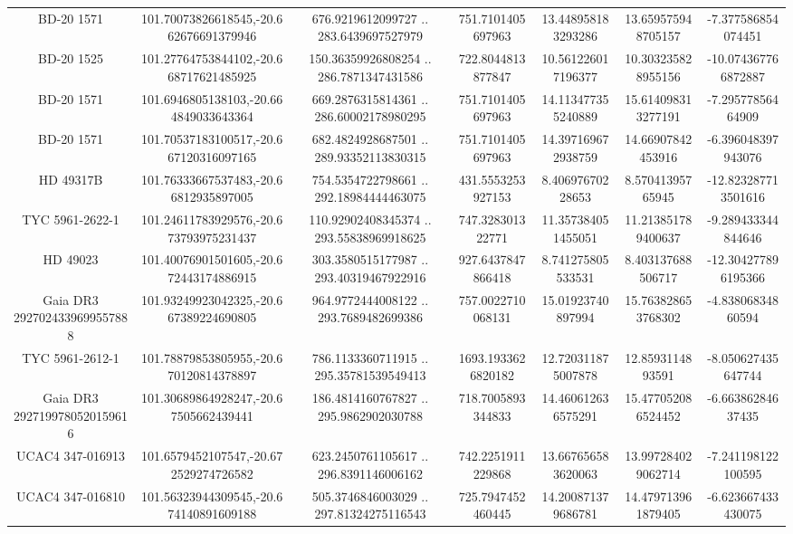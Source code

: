 \begin{table}
\begin{tabular}{ccccccc}
BD-20  1571 & 101.70073826618545,-20.662676691379946 & 676.9219612099727 .. 283.6439697527979 & 751.7101405697963 & 13.448958183293286 & 13.659575948705157 & -7.377586854074451 \\
BD-20  1525 & 101.27764753844102,-20.668717621485925 & 150.36359926808254 .. 286.7871347431586 & 722.8044813877847 & 10.561226017196377 & 10.303235828955156 & -10.074367766872887 \\
BD-20  1571 & 101.6946805138103,-20.664849033643364 & 669.2876315814361 .. 286.60002178980295 & 751.7101405697963 & 14.113477355240889 & 15.614098313277191 & -7.29577856464909 \\
BD-20  1571 & 101.70537183100517,-20.667120316097165 & 682.4824928687501 .. 289.93352113830315 & 751.7101405697963 & 14.397169672938759 & 14.66907842453916 & -6.396048397943076 \\
HD  49317B & 101.76333667537483,-20.66812935897005 & 754.5354722798661 .. 292.18984444463075 & 431.5553253927153 & 8.40697670228653 & 8.57041395765945 & -12.823287713501616 \\
TYC 5961-2622-1 & 101.24611783929576,-20.673793975231437 & 110.92902408345374 .. 293.55838969918625 & 747.328301322771 & 11.357384051455051 & 11.213851789400637 & -9.289433344844646 \\
HD  49023 & 101.40076901501605,-20.672443174886915 & 303.3580515177987 .. 293.40319467922916 & 927.6437847866418 & 8.741275805533531 & 8.403137688506717 & -12.304277896195366 \\
Gaia DR3 2927024339699557888 & 101.93249923042325,-20.667389224690805 & 964.9772444008122 .. 293.7689482699386 & 757.0022710068131 & 15.01923740897994 & 15.763828653768302 & -4.83806834860594 \\
TYC 5961-2612-1 & 101.78879853805955,-20.670120814378897 & 786.1133360711915 .. 295.35781539549413 & 1693.1933626820182 & 12.720311875007878 & 12.8593114893591 & -8.050627435647744 \\
Gaia DR3 2927199780520159616 & 101.30689864928247,-20.67505662439441 & 186.4814160767827 .. 295.9862902030788 & 718.7005893344833 & 14.460612636575291 & 15.477052086524452 & -6.66386284637435 \\
UCAC4 347-016913 & 101.6579452107547,-20.672529274726582 & 623.2450761105617 .. 296.8391146006162 & 742.2251911229868 & 13.667656583620063 & 13.997284029062714 & -7.241198122100595 \\
UCAC4 347-016810 & 101.56323944309545,-20.674140891609188 & 505.3746846003029 .. 297.81324275116543 & 725.7947452460445 & 14.200871379686781 & 14.479713961879405 & -6.623667433430075 \\

\end{tabular}
\end{table}
